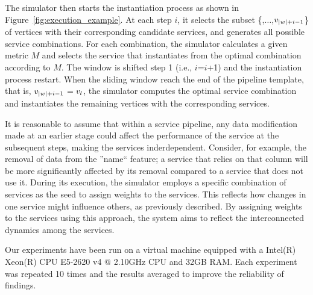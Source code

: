 The simulator then starts the instantiation process as shown in Figure~\ref{fig:execution_example}. At each step $i$, it selects the subset \{,$\ldots$,$v_{|w|+i-1}$\} of vertices with their corresponding candidate services, and generates all possible service combinations. For each combination, the simulator calculates a given metric $M$ and selects the service that instantiates  from the optimal combination according to $M$. The window is shifted step 1 (i.e., $i$=$i$+1) and the instantiation process restart. When the sliding window reach the end of the pipeline template, that is, $v_{|w|+i-1}$$=$$v_{l}$, the simulator computes the optimal service combination and instantiates the remaining vertices with the corresponding services.

It is reasonable to assume that within a service pipeline, any data modification made at an earlier stage could affect the performance of the service at the subsequent steps, making the services inderdependent. Consider, for example, the removal of data from the ''name`` feature; a service that relies on that column will be more significantly affected by its removal compared to a service that does not use it. During its execution, the simulator employs a specific combination of services as the seed to assign weights to the services. This reflects how changes in one service might influence others, as previously described. By assigning weights to the services using this approach, the system aims to reflect the interconnected dynamics among the services.

Our experiments have been run on a virtual machine equipped with a Intel(R) Xeon(R) CPU E5-2620 v4 @ 2.10GHz CPU and 32GB RAM.
Each experiment was repeated 10 times and the results averaged to improve the reliability of findings.

